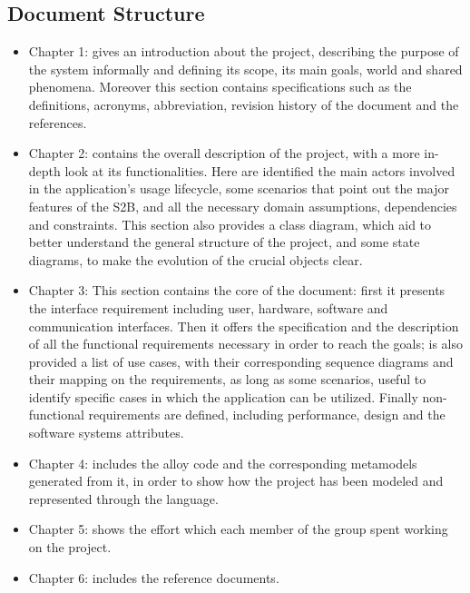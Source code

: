 \subsection{Document Structure}
\begin{itemize}
	\item Chapter 1: gives an introduction about the project, describing the purpose of the    system informally and defining its scope, its main goals, world and shared phenomena. Moreover this section contains specifications such as the definitions, acronyms, abbreviation,	revision history of the document and the references.
	\item Chapter 2: contains the overall description of the project, with a more in-depth look at its functionalities. Here are identified the main actors involved in the application’s usage lifecycle, some scenarios that point out the major features of the S2B, and all the necessary domain assumptions, dependencies and constraints. This section also provides a class diagram, which aid to better understand the general structure of the project, and some state diagrams, to make the evolution of the crucial objects clear.
	\item Chapter 3: This section contains the core of the document: first it presents the interface requirement including user, hardware, software and communication interfaces.
	Then it offers the specification and the description of all the functional requirements necessary in order to reach the goals; is also provided a list of use cases, with their corresponding sequence diagrams and their mapping on the requirements, as long as some scenarios, useful to identify specific cases in which the application can be utilized.
	Finally non-functional requirements are defined, including performance, design and the software systems attributes.
	\item Chapter 4: includes the alloy code and the corresponding metamodels generated from it, in order to show how the project has been modeled and represented through the language.   
	\item Chapter 5: shows the effort which each member of the group spent working on the project.
	\item Chapter 6: includes the reference documents.
\end{itemize}

